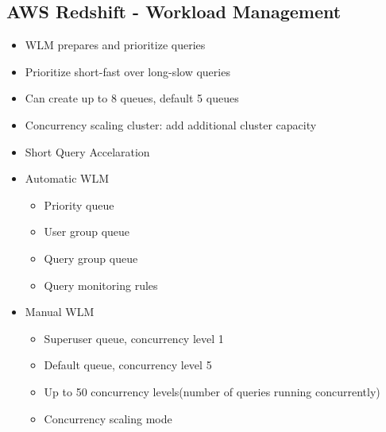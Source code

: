 \documentclass[../main.tex]{subfiles}
\begin{document}
\subsection{AWS Redshift - Workload Management}
\begin{itemize}
    \item WLM prepares and prioritize queries
    \item Prioritize short-fast over long-slow queries
    \item Can create up to 8 queues, default 5 queues
    \item Concurrency scaling cluster: add additional cluster capacity
    \item Short Query Accelaration
    \item Automatic WLM
    \begin{itemize}
        \item Priority queue
        \item User group queue
        \item Query group queue
        \item Query monitoring rules
    \end{itemize}
    \item Manual WLM
    \begin{itemize}
        \item Superuser queue, concurrency level 1
        \item Default queue, concurrency level 5
        \item Up to 50 concurrency levels(number of queries running concurrently)
        \item Concurrency scaling mode
    \end{itemize}
\end{itemize}
\end{document}
